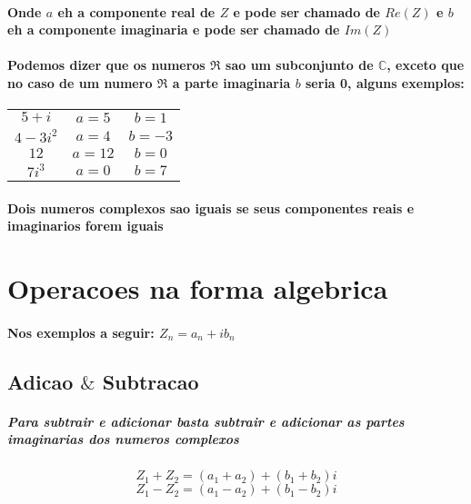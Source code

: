 \documentclass[12pt,twoside, a4paper, twocolumn]{article}
\begin{document}
\paragraph{Onde $a$ eh a componente real de $Z$ e pode ser chamado de $Re(Z)$ e $b$ eh a componente imaginaria e pode ser chamado de $Im(Z)$ }

\paragraph*{Podemos dizer que os numeros $\Re$ sao um subconjunto de $\mathbb{C}$, exceto que no caso de um numero $\Re$ a parte imaginaria $b$ seria 0, alguns exemplos:}
\begin{center}
    \begin{tabular}{ |c|c|c| }
        \hline
        $5 + i$    & $a = 5$  & $b = 1$  \\
        $4 - 3i^2$ & $a = 4$  & $b = -3$ \\
        $12$       & $a = 12$ & $b = 0$  \\
        $7i^3$     & $a = 0$  & $b = 7$  \\
        \hline
    \end{tabular}
\end{center}
\paragraph{Dois numeros complexos sao iguais se seus componentes reais e imaginarios forem iguais}

\section{Operacoes na forma algebrica}

\paragraph*{Nos exemplos a seguir: $Z_n = a_n + ib_n$}

\subsection{Adicao $\&$ Subtracao}
\subparagraph{Para subtrair e adicionar basta subtrair e adicionar as partes imaginarias dos numeros complexos}

\begin{equation}
    Z_1 + Z_2 = (a_1+a_2) + (b_1+b_2)i
\end{equation}
\begin{equation}
    Z_1 - Z_2 = (a_1-a_2) + (b_1-b_2)i
\end{equation}
\end{document}
